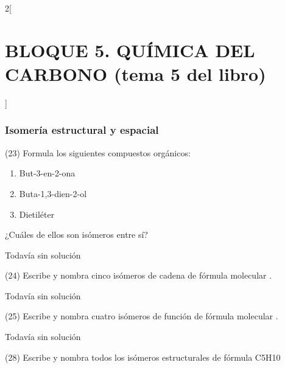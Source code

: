 \documentclass[10pt]{article}
\begin{document}
\begin{multicols}{2}[
  \section{BLOQUE 5. QUÍMICA DEL CARBONO (tema 5 del libro)}
  ]
\subsubsection{Isomería estructural y espacial}

\begin{exercise}[
    tags    = {},
    topics  = {química, química orgánica, orgánica},
    source  = {FQ 1B MGH 2016, p152, e23},
  ]
  (23) Formula los siguientes compuestos orgánicos:
  \begin{enumerate}
    \item But-3-en-2-ona
    \item Buta-1,3-dien-2-ol
    \item Dietiléter
  \end{enumerate}
  ¿Cuáles de ellos son isómeros entre sí?
\end{exercise}

\begin{solution}[print=false]
  Todavía sin solución
\end{solution}




\begin{exercise}[
    tags    = {},
    topics  = {química, química orgánica, orgánica},
    source  = {FQ 1B MGH 2016, p152, e24},
  ]
  (24) Escribe y nombra cinco isómeros de cadena de fórmula molecular .
\end{exercise}

\begin{solution}[print=false]
  Todavía sin solución
\end{solution}




\begin{exercise}[
    tags    = {},
    topics  = {química, química orgánica, orgánica},
    source  = {FQ 1B MGH 2016, p152, e25},
  ]
  (25) Escribe y nombra cuatro isómeros de función de fórmula molecular .
\end{exercise}

\begin{solution}[print=false]
  Todavía sin solución
\end{solution}




\begin{exercise}[
    tags    = {},
    topics  = {química, química orgánica, orgánica},
    source  = {FQ 1B MGH 2016, p152, e28},
  ]
  (28) Escribe y nombra todos los isómeros estructurales de fórmula C5H10
\end{exercise}


\end{multicols}
\end{document}

